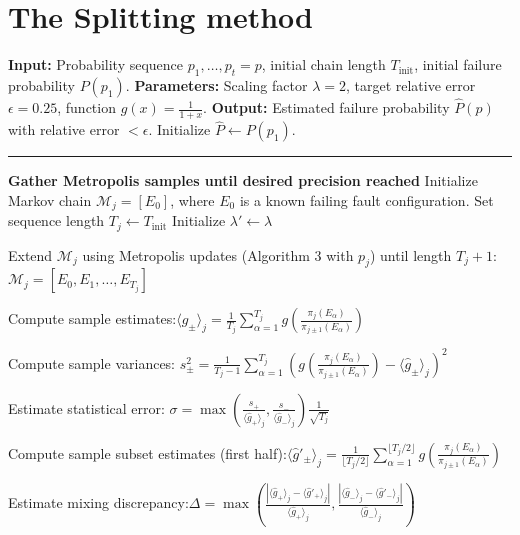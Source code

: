 \section{The Splitting method}

\begin{algorithm}[t]
\caption{Splitting Method for Estimating $P(p)$}
\begin{algorithmic}[1]

\State \textbf{Input:} Probability sequence $p_1,\ldots,p_t = p$, initial chain length $T_{\text{init}}$, initial failure probability $P(p_1)$.
\State \textbf{Parameters:} Scaling factor $\lambda = 2$, target relative error $\epsilon = 0.25$, function $g(x) = \frac{1}{1+x}$.
\State \textbf{Output:} Estimated failure probability $\hat{P}(p)$ with relative error $< \epsilon$.
\State Initialize $\hat{P} \gets P(p_1)$.

\hrule
\textbf{Gather Metropolis samples until desired precision reached}
\State Initialize Markov chain $\mathcal{M}_j = [E_0]$, where $E_0$ is a known failing fault configuration.
\State Set sequence length $T_j \gets T_{\text{init}}$
\State Initialize $\lambda' \gets \lambda$

    \State Extend $\mathcal{M}_j$ using Metropolis updates (Algorithm 3 with $p_j$) until length $T_j + 1$: $\mathcal{M}_j = [E_0, E_1, \ldots, E_{T_j}]$

    \State Compute sample estimates:$
    \langle \hat{g}_\pm \rangle_j = \frac{1}{T_j} \sum_{\alpha=1}^{T_j} g\left(\frac{\pi_j(E_\alpha)}{\pi_{j\pm1}(E_\alpha)}\right)
    $

    \State Compute sample variances: 
    $
    s_\pm^2 = \frac{1}{T_j - 1} \sum_{\alpha=1}^{T_j} 
    \left( g\left(\frac{\pi_j(E_\alpha)}{\pi_{j\pm1}(E_\alpha)}\right) - \langle \hat{g}_\pm \rangle_j \right)^2
    $

    \State Estimate statistical error: $
    \sigma = \max\left( \frac{s_+}{\langle \hat{g}_+ \rangle_j}, \frac{s_-}{\langle \hat{g}_- \rangle_j} \right) \frac{1}{\sqrt{T_j}}
    $

    \State Compute sample subset estimates (first half):$\langle \hat{g}'_\pm \rangle_j = \frac{1}{\lfloor T_j/2 \rfloor} 
    \sum_{\alpha=1}^{\lfloor T_j/2 \rfloor} 
    g\left(\frac{\pi_j(E_\alpha)}{\pi_{j\pm1}(E_\alpha)}\right)
    $

    \State Estimate mixing discrepancy:$ \Delta = \max\left(
    \frac{|\langle \hat{g}_+ \rangle_j - \langle \hat{g}'_+ \rangle_j|}{\langle \hat{g}_+ \rangle_j},
    \frac{|\langle \hat{g}_- \rangle_j - \langle \hat{g}'_- \rangle_j|}{\langle \hat{g}_- \rangle_j}
    \right)$


\end{algorithmic}
\end{algorithm}
